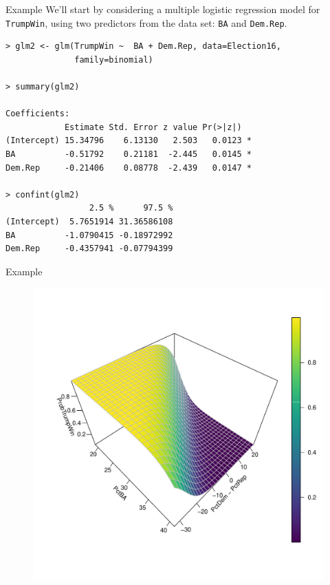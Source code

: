 \documentclass[10pt]{beamer}\usepackage[]{graphicx}\usepackage[]{color}
\begin{document}
\begin{frame}[fragile]{Example}
We'll start by considering a multiple logistic regression model for \texttt{TrumpWin}, using two predictors from the data set: \texttt{BA} and \texttt{Dem.Rep}. 
\small
\begin{verbatim}
> glm2 <- glm(TrumpWin ~  BA + Dem.Rep, data=Election16, 
              family=binomial) 
              
> summary(glm2)

Coefficients:
            Estimate Std. Error z value Pr(>|z|)  
(Intercept) 15.34796    6.13130   2.503   0.0123 *
BA          -0.51792    0.21181  -2.445   0.0145 *
Dem.Rep     -0.21406    0.08778  -2.439   0.0147 *

> confint(glm2)
                 2.5 %      97.5 %
(Intercept)  5.7651914 31.36586108
BA          -1.0790415 -0.18972992
Dem.Rep     -0.4357941 -0.07794399
\end{verbatim}
\normalsize
\end{frame}

\begin{frame}{Example}
\begin{figure}
\includegraphics[scale=0.4]{figure/logit3D.pdf}
\end{figure}
\end{frame}
\end{document}
